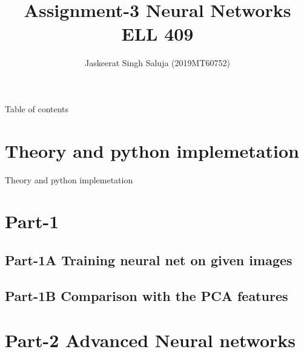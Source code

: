 \documentclass[12pt,t]{beamer}
\author{Jaskeerat Singh Saluja (2019MT60752)}
\title{Assignment-3 Neural Networks \\ ELL 409}
\begin{document}
\begin{frame}[t]
    \titlepage
\end{frame}
    
\begin{frame}[t]{Table of contents}
    \scriptsize
    \tableofcontents
\end{frame}

\section{Theory and python implemetation}
\begin{frame}[t]{Theory and python implemetation }
    
\end{frame}


\section{Part-1}
\subsection{Part-1A Training neural net on given images}
\begin{frame}


\end{frame}
\subsection{Part-1B Comparison with the PCA features}
\begin{frame}
    \frametitle{}

    

\end{frame}


\section{Part-2 Advanced Neural networks}
\begin{frame}
    \frametitle{}

    

\end{frame}
\end{document}
